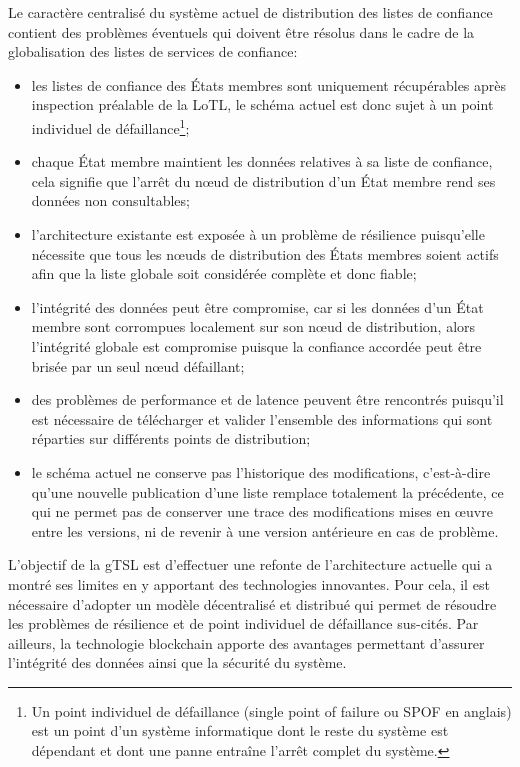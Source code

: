 \documentclass{tnreport}
\begin{document}
Le caractère centralisé du système actuel de distribution des listes de confiance contient des 
problèmes éventuels qui doivent être résolus dans le cadre de la globalisation des listes de services de confiance:
\begin{itemize}
	\item les listes de confiance des États membres sont uniquement récupérables après inspection préalable de la LoTL, le schéma actuel est donc sujet à un point individuel de défaillance\footnote{Un point individuel de défaillance (single point of failure ou SPOF en anglais) est un point d'un système informatique dont le reste du système est dépendant et dont une panne entraîne l'arrêt complet du système.};
	\item chaque État membre maintient les données relatives à sa liste de confiance, cela signifie que l'arrêt du nœud de distribution d'un État membre rend ses données non consultables;
	\item l'architecture existante est exposée à un problème de résilience puisqu'elle nécessite que tous les nœuds de distribution des États membres soient actifs afin que la liste globale soit considérée complète et donc fiable;
	\item l'intégrité des données peut être compromise, car si les données d'un État membre sont corrompues localement sur son nœud de distribution, alors l'intégrité globale est compromise puisque la confiance accordée peut être brisée par un seul nœud défaillant;
	\item des problèmes de performance et de latence peuvent être rencontrés puisqu'il est nécessaire de télécharger et valider l'ensemble des informations qui sont réparties sur différents points de distribution;
	\item le schéma actuel ne conserve pas l'historique des modifications, c'est-à-dire qu'une nouvelle publication d'une liste remplace totalement la précédente, ce qui ne permet pas de conserver une trace des modifications mises en œuvre entre les versions, ni de revenir à une version antérieure en cas de problème.
	\newline
\end{itemize}

L'objectif de la gTSL est d'effectuer une refonte de l'architecture actuelle qui a montré ses limites en y apportant des technologies innovantes. Pour cela, il est nécessaire d'adopter un modèle décentralisé et distribué qui permet de résoudre les problèmes de résilience et de point individuel de défaillance sus-cités. Par ailleurs, la technologie blockchain apporte des avantages permettant d'assurer l'intégrité des données ainsi que la sécurité du système.
\end{document}

